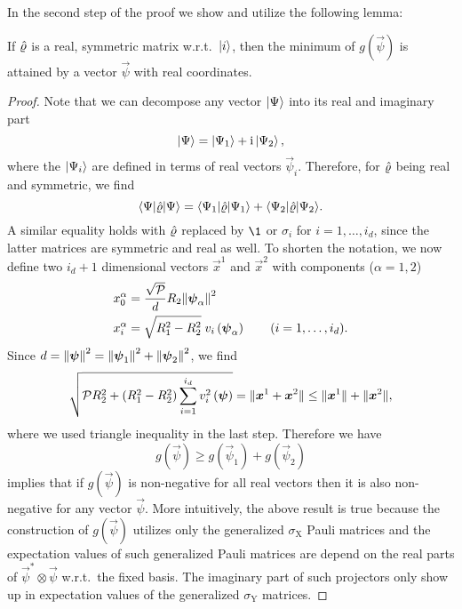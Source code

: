 In the second step of the proof we show and utilize the following lemma:
\begin{lemma}\label{lem:ellpos.real_min}
  If $\hat{\varrho}$ is a real, symmetric matrix w.r.t.\ $\ket{i}$, then the minimum of $g(\vec\psi)$ is attained by a vector $\vec{\psi}$ with real coordinates.
\end{lemma}
\begin{proof}
  Note that we can decompose any vector $\ket\Psi$ into its real and imaginary part
  \[
    \ket\Psi = \ket{\Psi_1} + \ii\Ket{\Psi_2},
  \]
  where the $\ket{\Psi_i}$ are defined in terms of real vectors $\vec\psi_i$.
  Therefore, for $\hat{\varrho}$ being real and symmetric, we find
  \[
    \bra{\Psi} \estim\varrho \ket{\Psi} = \bra{\Psi_1} \estim\varrho \ket{\Psi_1} + \bra{\Psi_2} \estim\varrho \ket{\Psi_2}.
  \]
  A similar equality holds with $\hat{\varrho}$ replaced by $\1$ or $\sigma_i$ for $i=1,\ldots,i_d$, since the latter matrices are symmetric and real as well.
  To shorten the notation, we now define two $i_d+1$ dimensional vectors $\vec x^1$ and $\vec x^2$ with components ($\alpha=1,2$)
  \[
    \begin{split}
      x^\alpha_0 &= \frac{\sqrt{\mathcal{P}}}{d} R_2 {\Vert{\boldsymbol{\psi}}_\alpha\Vert}^2 \\
      x^\alpha_i &= \sqrt{R_1^2 - R_2^2}\;v_i\left({\boldsymbol{\psi}}_\alpha\right) \qquad (i=1,\ldots,i_d).
    \end{split}
  \]
  Since $d = {\Vert{\boldsymbol{\psi}}\Vert}^2 = {\Vert{\boldsymbol{\psi}}_1\Vert}^2 + {\Vert{\boldsymbol{\psi}}_2\Vert}^2$, we find
  \[
  \sqrt{ \mathcal{P} R_2^2 + (R_1^2 - R_2^2) \sum_{i=1}^{i_d} v_{i}^{2}\left({\boldsymbol{\psi}}\right)} = {\Vert{\boldsymbol{x}}^1 + {\boldsymbol{x}}^2\Vert} \le {\Vert{\boldsymbol{x}}^1\Vert} + {\Vert{\boldsymbol{x}}^2\Vert},
  \]
  where we used triangle inequality in the last step.
  Therefore we have
  \[
    \label{eq:ellpos.g_decomp}
    g(\vec\psi) \geq  g(\vec\psi_1) + g(\vec\psi_2)
  \]
   implies that if $g(\vec\psi)$ is non-negative for all real vectors then it is also non-negative for any vector $\vec\psi$.
  More intuitively, the above result is true because the construction of $g(\vec\psi)$ utilizes only the generalized $\sigma_\mathrm{X}$ Pauli matrices and the expectation values of such generalized Pauli matrices are depend on the real parts of $\vec\psi^*\otimes\vec\psi$ w.r.t.\ the fixed basis.
  The imaginary part of such projectors only show up in expectation values of the generalized $\sigma_\mathrm{Y}$ matrices.
\end{proof}

